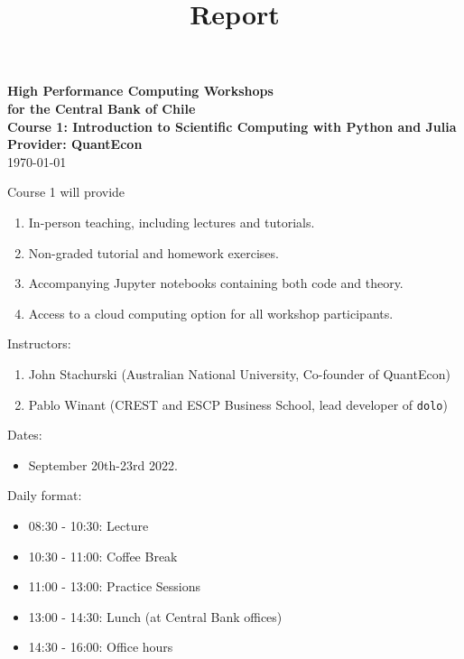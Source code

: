 \documentclass[12pt]{article}
\begin{document}
\title{Report}

\date{}


\begin{center}
    {\bf {\Large High Performance Computing Workshops \\
            for the Central Bank of Chile
    \\
    \vspace{1em}
    {\Large Course 1: Introduction to Scientific Computing with Python and Julia}
    \\
    \vspace{1em}
    Provider: QuantEcon \\
    }}
    \vspace{1em}
    \today
\end{center}


\vspace{.01in}







\thispagestyle{fancy}
Course 1 will provide 
%
\begin{enumerate}
    \item In-person teaching, including lectures and
        tutorials.
    \item Non-graded tutorial and homework exercises.
    \item Accompanying Jupyter notebooks containing both code and theory.
    \item Access to a cloud computing option for all workshop participants.
\end{enumerate}

Instructors:
%
\begin{enumerate}
    \item John Stachurski (Australian National University, Co-founder of QuantEcon)
    \item Pablo Winant (CREST and ESCP Business School, lead developer of \texttt{dolo})
\end{enumerate}

Dates: 
%
\begin{itemize}
    \item September 20th-23rd 2022.
\end{itemize}

Daily format:
%
\begin{itemize}
    \item 08:30 - 10:30: Lecture
    \item 10:30 - 11:00: Coffee Break
    \item 11:00 - 13:00: Practice Sessions
    \item 13:00 - 14:30: Lunch (at Central Bank offices)
    \item 14:30 - 16:00: Office hours
\end{itemize}
\end{document}
